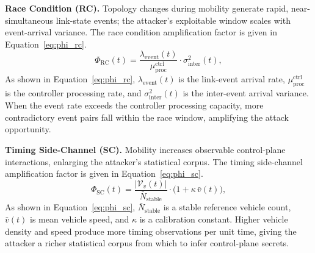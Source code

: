 \textbf{Race Condition (RC).} Topology changes during mobility
generate rapid, near-simultaneous link-state events; the
attacker's exploitable window scales with event-arrival variance.
The race condition amplification factor is given in
Equation~\eqref{eq:phi_rc}.
\begin{equation}
\Phi_{\mathrm{RC}}(t) =
  \frac{\lambda_{\mathrm{event}}(t)}{\mu_{\mathrm{proc}}^{\mathrm{ctrl}}}
  \cdot\sigma_{\mathrm{inter}}^{2}(t),
\label{eq:phi_rc}
\end{equation}
As shown in Equation~\eqref{eq:phi_rc},
$\lambda_{\mathrm{event}}(t)$ is the link-event arrival rate,
$\mu_{\mathrm{proc}}^{\mathrm{ctrl}}$ is the controller processing
rate, and $\sigma_{\mathrm{inter}}^{2}(t)$ is the inter-event
arrival variance. When the event rate exceeds the controller
processing capacity, more contradictory event pairs fall within
the race window, amplifying the attack opportunity.

\textbf{Timing Side-Channel (SC).} Mobility increases observable
control-plane interactions, enlarging the attacker's statistical
corpus. The timing side-channel amplification factor is given in
Equation~\eqref{eq:phi_sc}.
\begin{equation}
\Phi_{\mathrm{SC}}(t) =
  \frac{|\mathcal{V}_v(t)|}{\bar{N}_{\mathrm{stable}}}
  \cdot\bigl(1+\kappa\,\bar{v}(t)\bigr),
\label{eq:phi_sc}
\end{equation}
As shown in Equation~\eqref{eq:phi_sc}, $\bar{N}_{\mathrm{stable}}$
is a stable reference vehicle count, $\bar{v}(t)$ is mean vehicle
speed, and $\kappa$ is a calibration constant. Higher vehicle
density and speed produce more timing observations per unit time,
giving the attacker a richer statistical corpus from which to
infer control-plane secrets.

